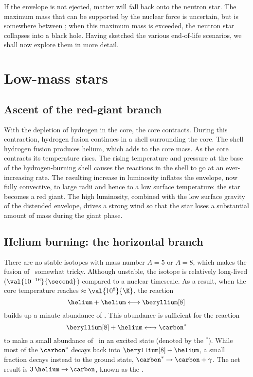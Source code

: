 If the envelope is not ejected, matter will fall back onto the neutron star. The maximum mass that can be supported by the nuclear force is uncertain, but is somewhere between ; when this maximum mass is exceeded, the neutron star collapses into a black hole.
Having sketched the various end-of-life scenarios, we shall now explore them in more detail.

\section{Low-mass stars}

\subsection{Ascent of the red-giant branch}

With the depletion of hydrogen in the core, the core contracts. During this contraction, hydrogen fusion continues in a shell surrounding the core. The shell hydrogen fusion produces helium, which adds to the core mass. As the core contracts its temperature rises. The rising temperature and pressure at the base of the hydrogen-burning shell causes the reactions in the shell to go at an ever-increasing rate. The resulting increase in luminosity inflates the envelope, now fully convective, to large radii and hence to a low surface temperature: the star becomes a red giant. The high luminosity, combined with the low surface gravity of the distended envelope, drives a strong wind so that the star loses a substantial amount of mass during the giant phase.

\subsection{Helium burning: the horizontal branch}
There are no stable isotopes with mass number $A=5$ or $A=8$, which makes the fusion of \helium\ somewhat tricky. Although unstable, the isotope \beryllium[8] is relatively long-lived ($\val{10^{-16}}{\second}$) compared to a nuclear timescale. As a result,
when the core temperature reaches $\approx\val{10^{8}}{\K}$, the reaction
\[ \helium + \helium \longleftrightarrow\beryllium[8] \]
builds up a minute abundance of \beryllium[8]. This abundance is sufficient for the reaction
\[ \beryllium[8] + \helium \longleftrightarrow \carbon^{*} \]
to make a small abundance of \carbon\ in an excited state (denoted by the $^{*}$).  While most of the $\carbon^{*}$ decays back into $\beryllium[8]+\helium$, a small fraction decays instead to the ground state, $\carbon^{*}\to\carbon+\gamma$. The net result is $3\,\helium\to\carbon$, known as the .

